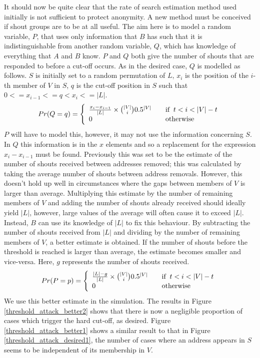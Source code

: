 \documentclass[ %
                    author={Luke Murray},
                supervisor={Dr. Simon Hollis},
                     title={Shadow Peer-to-Peer Networks},
                  subtitle={},
                    degree={MEng},
                      year={2013} ]{thesis}
\begin{document}
It should now be quite clear that the rate of search estimation method used initially is not sufficient to protect anonymity. A new method must be conceived if shout groups are to be at all useful. The aim here is to model a random variable, $P$, that uses only information that $B$ has such that it is indistinguishable from another random variable, $Q$, which has knowledge of everything that $A$ and $B$ know. $P$ and $Q$ both give the number of shouts that are responded to before a cut-off occurs. As in the desired case, $Q$ is modelled as follows. $S$ is initially set to a random permutation of $L$, $x_i$ is the position of the $i$-th member of $V$ in $S$, $q$ is the cut-off position in $S$ such that $0 <= x_{i-1} <= q < x_i <= |L|$.
\[Pr(Q = q) = \left\{
    \begin{array}{l l}
        \frac{x_i - x_{i-1}}{|L|} \times {|V| \choose i}0.5^{|V|} & \quad \text{if}\;\;t < i < |V| - t\\
        0 & \quad \text{otherwise}
    \end{array}
\right.\]
$P$ will have to model this, however, it may not use the information concerning $S$. In $Q$ this information is in the $x$ elements and so a replacement for the expression ${x_i - x_{i-1}}$ must be found. Previously this was set to be the estimate of the number of shouts received between addresses removed; this was calculated by taking the average number of shouts between address removals. However, this doesn't hold up well in circumstances where the gaps between members of $V$ is larger than average. Multiplying this estimate by the number of remaining members of $V$ and adding the number of shouts already received should ideally yield $|L|$, however, large values of the average will often cause it to exceed $|L|$. Instead, $B$ can use its knowledge of $|L|$ to fix this behaviour. By subtracting the number of shouts received from $|L|$ and dividing by the number of remaining members of $V$, a better estimate is obtained. If the number of shouts before the threshold is reached is larger than average, the estimate becomes smaller and vice-versa. Here, $g$ represents the number of shouts received.
\[Pr(P = p) = \left\{
    \begin{array}{l l}
        \frac{|L| - g}{|L|} \times {|V| \choose i}0.5^{|V|} & \quad \text{if}\;\;t < i < |V| - t\\
        0 & \quad \text{otherwise}
    \end{array}
\right.\]
We use this better estimate in the simulation. The results in Figure \ref{threshold_attack_better2} shows that there is now a negligible proportion of cases which trigger the hard cut-off, as desired. Figure \ref{threshold_attack_better1} shows a similar result to that in Figure \ref{threshold_attack_desired1}, the number of cases where an address appears in $S$ seems to be independent of its membership in $V$.
\end{document}
